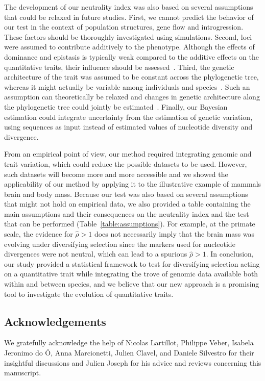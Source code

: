\documentclass{article}
\newcommand{\EstNI}{\widehat{\rho}}
\begin{document}
The development of our neutrality index was also based on several assumptions that could be relaxed in future studies.
First, we cannot predict the behavior of our test in the context of population structures, gene flow and introgression.
These factors should be thoroughly investigated using simulations.
Second, loci were assumed to contribute additively to the phenotype.
Although the effects of dominance and epistasis is typically weak compared to the additive effects on the quantitative traits, their influence should be assessed~\parencite{hill_data_2008, crow_epistasis_2010}.
Third, the genetic architecture of the trait was assumed to be constant across the phylogenetic tree, whereas it might actually be variable among individuals and species~\parencite{tung_genetic_2015, huber_conservatism_2015}.
Such an assumption can theoretically be relaxed and changes in genetic architecture along the phylogenetic tree could jointly be estimated~\parencite{arnold_understanding_2008, hohenlohe_mipod_2008, kostikova_bridging_2016, gaboriau_multiplatform_2020}.
Finally, our Bayesian estimation could integrate uncertainty from the estimation of genetic variation, using sequences as input instead of estimated values of nucleotide diversity and divergence.

From an empirical point of view, our method required integrating genomic and trait variation, which could reduce the possible datasets to be used.
However, such datasets will become more and more accessible and we showed the applicability of our method by applying it to the illustrative example of mammals brain and body mass.
Because our test was also based on several assumptions that might not hold on empirical data, we also provided a table containing the main assumptions and their consequences on the neutrality index and the test that can be performed (Table~\ref{table:assumptions}).
For example, at the primate scale, the evidence for $\EstNI > 1$ does not necessarily imply that the brain mass was evolving under diversifying selection since the markers used for nucleotide divergences were not neutral, which can lead to a spurious $\EstNI > 1$.
In conclusion, our study provided a statistical framework to test for diversifying selection acting on a quantitative trait while integrating the trove of genomic data available both within and between species, and we believe that our new approach is a promising tool to investigate the evolution of quantitative traits.


\subsection*{Acknowledgements}
 We gratefully acknowledge the help of Nicolas Lartillot, Philippe Veber, Isabela Jeronimo do Ó, Anna Marcionetti, Julien Clavel, and Daniele Silvestro for their insightful discussions and Julien Joseph for his advice and reviews concerning this manuscript.
\end{document}

